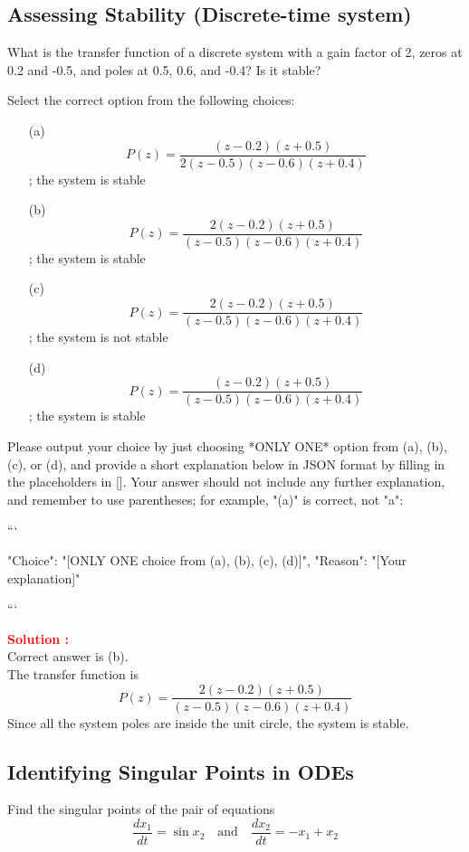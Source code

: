 \documentclass[12pt]{article}
\begin{document}
\subsection{Assessing Stability (Discrete-time system)}

What is the transfer function of a discrete system with a gain factor of 2, zeros at 0.2 and -0.5, and poles at 0.5, 0.6, and -0.4? Is it stable?


Select the correct option from the following choices:
\begin{itemize}
    \item[(a)] \[ P(z) = \frac{(z - 0.2)(z + 0.5)}{2(z - 0.5)(z - 0.6)(z + 0.4)} \]; the system is stable
    \item[(b)] \[ P(z) = \frac{2(z - 0.2)(z + 0.5)}{(z - 0.5)(z - 0.6)(z + 0.4)} \]; the system is stable
    \item[(c)] \[ P(z) = \frac{2(z - 0.2)(z + 0.5)}{(z - 0.5)(z - 0.6)(z + 0.4)} \]; the system is not stable
    \item[(d)] \[ P(z) = \frac{(z - 0.2)(z + 0.5)}{(z - 0.5)(z - 0.6)(z + 0.4)} \]; the system is stable
\end{itemize}




Please output your choice by just choosing *ONLY ONE* option from (a), (b), (c), or (d), and provide a short explanation below in JSON format by filling in the placeholders in []. Your answer should not include any further explanation, and remember to use parentheses; for example, "(a)" is correct, not "a":

```

{
"Choice": "[ONLY ONE choice from (a), (b), (c), (d)]",
"Reason": "[Your explanation]"
}

```

\textbf{\textcolor{red}{Solution :}} \\
Correct answer is (b).\\
The transfer function is
\[ P(z) = \frac{2(z - 0.2)(z + 0.5)}{(z - 0.5)(z - 0.6)(z + 0.4)} \]
Since all the system poles are inside the unit circle, the system is stable.
\clearpage

\subsection{Identifying Singular Points in ODEs}

Find the singular points of the pair of equations
\[
\frac{dx_1}{dt} = \sin x_2 \quad \text{and} \quad \frac{dx_2}{dt} = -x_1 + x_2
\]
\end{document}
